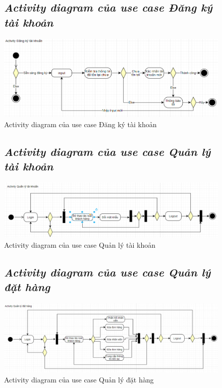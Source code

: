\documentclass{report}
\begin{document}
\begin{figure}[htp]
    \subsection{\textit{Activity diagram của use case Đăng ký tài khoản}}
    \centering
    \includegraphics[scale = 0.6]{image/activity_dktk.PNG}
    \caption{Activity diagram của use case Đăng ký tài khoản}
\end{figure}

\begin{figure}[htp]
    \subsection{\textit{Activity diagram của use case Quản lý tài khoản}}
    \centering
    \includegraphics[scale = 0.55]{image/activity_qltk.PNG}
    \caption{Activity diagram của use case Quản lý tài khoản}
\end{figure}

\begin{figure}[htp]
    \subsection{\textit{Activity diagram của use case Quản lý đặt hàng}}
    \centering
    \includegraphics[scale = 0.5]{image/activity_qldathang.PNG}
    \caption{Activity diagram của use case Quản lý đặt hàng}
\end{figure}
\end{document}
